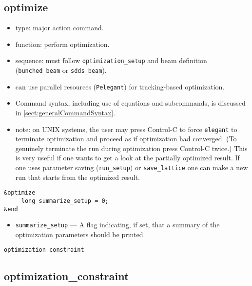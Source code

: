 \documentclass[11pt]{article}
\begin{document}
\subsection{optimize \label{subsec:optimize}}

\begin{itemize}
\item type: major action command.
\item function: perform optimization.
\item sequence: must follow \verb|optimization_setup| and beam definition (\verb|bunched_beam| or \verb|sdds_beam|).
\item can use parallel resources (\verb|Pelegant|) for tracking-based optimization.
\item Command syntax, including use of equations and subcommands, is discussed in \ref{sect:generalCommandSyntax}.
\item note: on UNIX systems, the user may press Control-C to force
\verb|elegant| to terminate optimization and proceed as if
optimization had converged.  (To genuinely terminate the run during
optimization press Control-C twice.) This is very useful if one wants
to get a look at the partially optimized result.  If one uses parameter
saving (\verb|run_setup|) or \verb|save_lattice| one can make a new
run that starts from the optimized result.
\end{itemize}

\begin{verbatim}
&optimize
     long summarize_setup = 0;
&end
\end{verbatim}

\begin{itemize}

\item \verb|summarize_setup| --- A flag indicating, if set, that a
summary of the optimization parameters should be printed.
\end{itemize}

\newpage
\begin{center}{\Large\verb|optimization_constraint|}\end{center}
\subsection{optimization\_constraint \label{subsec:optimizationconstraint}}
\end{document}
